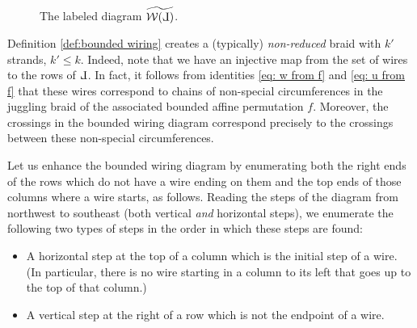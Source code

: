 \documentclass[10pt]{amsart}
\theoremstyle{plain}
\theoremstyle{definition}
\theoremstyle{remark}
\numberwithin{equation}{section}
\newcommand{\wire}[1]{\mathcal{W}(#1)}
\newcommand{\MG}[1]{{\color{teal}{{\bf Misha}: #1}}}
\def\Le{\reflectbox{$\mathrm{L}$}}
\begin{document}
\begin{figure}[h!]
\caption{The labeled diagram $\widetilde{\wire{\Le}}$.}\label{fig:bounded_wiring_diagram}
\end{figure}

Definition \ref{def:bounded wiring} creates a (typically) \emph{non-reduced} braid with $k'$ strands, $k' \leq k$. Indeed, note that we have an injective map from the set of wires to the rows of $\Le$. In fact, it follows from identities \eqref{eq: w from f} and \eqref{eq: u from f} that these wires correspond to chains of non-special circumferences in the juggling braid of the associated bounded affine permutation $f$. Moreover, the crossings in the bounded wiring diagram correspond precisely to the crossings between these non-special circumferences. %

Let us enhance the bounded wiring diagram by enumerating both the right ends of the rows which do not have a wire ending on them and the top ends of those columns where a wire starts, as follows. Reading the steps of the diagram from northwest to southeast (both vertical \emph{and} horizontal steps), we enumerate the following two types of steps in the order in which these steps are found:
\begin{itemize}
    \item[-] A horizontal step at the top of a column which is the initial step of a wire. (In particular, there is no wire starting in a column to its left that goes up to the top of that column.)\\
    
    \item[-] A vertical step at the right of a row which is not the endpoint of a wire. 
\end{itemize}
\end{document}
